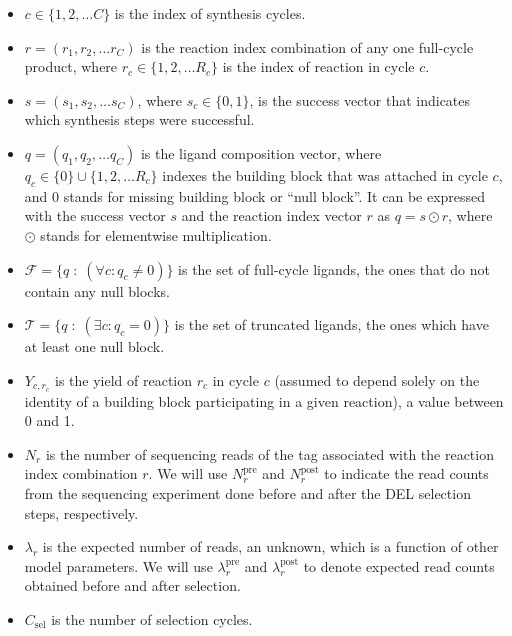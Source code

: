 \documentclass[letter,10pt,oneside]{article}
\newcommand{\+}{^\dagger}
\begin{document}
\begin{itemize}
  \item $c \in \{1,2,\ldots C\}$ is the index of synthesis cycles.

  \item $r = (r_1, r_2, \ldots r_C)$ is the reaction index combination of any one full-cycle product, where $r_c \in \{1,2,\ldots R_c\}$ is the index of reaction in cycle $c$.
  
  \item $s = (s_1, s_2, \ldots s_C)$, where $s_c \in \{0,1\}$, is the success vector that indicates which synthesis steps were successful.
  
  \item $q = (q_1, q_2, \ldots q_C)$ is the ligand composition vector, where $q_c \in \{0\}\cup \{1,2,\ldots R_c\}$ indexes the building block that was attached in cycle $c$, and 0 stands for missing building block or ``null block''. It can be expressed with the success vector $s$ and the reaction index vector $r$ as $q = s \odot r$, where $\odot$ stands for elementwise multiplication.

  \item $\mathcal{F} = \{q\;:\; (\forall c: q_c \neq 0)\}$ is the set of full-cycle ligands, the ones that do not contain any null blocks.

  \item $\mathcal{T} = \{q\;:\; (\exists c: q_c = 0)\}$ is the set of truncated ligands, the ones which have at least one null block.
  
  \item $Y_{c, r_c}$ is the yield of reaction $r_c$ in cycle $c$ (assumed to depend solely on the identity of a building block participating in a given reaction), a value between 0 and 1.

  \item $N_r$ is the number of sequencing reads of the tag associated with the reaction index combination $r$. We will use $N^\text{pre}_r$ and $N^\text{post}_r$ to indicate the read counts from the sequencing experiment done before and after the DEL selection steps, respectively.

  \item $\lambda_r$ is the expected number of reads, an unknown, which is a function of other model parameters. We will use $\lambda_r^\text{pre}$ and $\lambda_r^\text{post}$ to denote expected read counts obtained before and after selection.

  \item $C_\text{sel}$ is the number of selection cycles.


\end{itemize}
\end{document}
